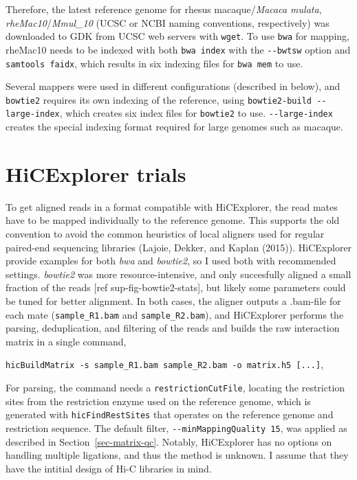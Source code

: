 \documentclass[
  11pt,
  a4paper,
]{scrbook}
\let\oldemph\emph
\renewcommand\emph[1]{\oldemph{\color{gray}#1}}
\begin{document}
Therefore, the latest reference genome for rhesus macaque/\emph{Macaca
mulata}, \emph{rheMac10}/\emph{Mmul\_10} (UCSC or NCBI naming
conventions, respectively) was downloaded to GDK from UCSC web servers
with \texttt{wget}. To use \texttt{bwa} for mapping, rheMac10 needs to
be indexed with both \texttt{bwa\ index} with the \texttt{-\/-bwtsw}
option and \texttt{samtools\ faidx}, which results in six indexing files
for \texttt{bwa\ mem} to use.

Several mappers were used in different configurations (described in
below), and \texttt{bowtie2} requires its own indexing of the reference,
using \texttt{bowtie2-build\ -\/-large-index}, which creates six index
files for \texttt{bowtie2} to use. \texttt{-\/-large-index} creates the
special indexing format required for large genomes such as macaque.

\section{HiCExplorer trials}\label{hicexplorer-trials}

To get aligned reads in a format compatible with HiCExplorer, the read
mates have to be mapped individually to the reference genome. This
supports the old convention to avoid the common heuristics of local
aligners used for regular paired-end sequencing libraries (Lajoie,
Dekker, and Kaplan (2015)). HiCExplorer provide examples for both
\emph{bwa} and \emph{bowtie2}, so I used both with recommended settings.
\emph{bowtie2} was more resource-intensive, and only succesfully aligned
a small fraction of the reads {[}ref sup-fig-bowtie2-stats{]}, but
likely some parameters could be tuned for better alignment. In both
cases, the aligner outputs a .bam-file for each mate
(\texttt{sample\_R1.bam} and \texttt{sample\_R2.bam}), and HiCExplorer
performs the parsing, deduplication, and filtering of the reads and
builds the raw interaction matrix in a single command,

\texttt{hicBuildMatrix\ -s\ sample\_R1.bam\ sample\_R2.bam\ -o\ matrix.h5\ {[}...{]}},

For parsing, the command needs a \texttt{restrictionCutFile}, locating
the restriction sites from the restriction enzyme used on the reference
genome, which is generated with \texttt{hicFindRestSites} that operates
on the reference genome and restriction sequence. The default filter,
\texttt{-\/-minMappingQuality\ 15}, was applied as described in
Section~\ref{sec-matrix-qc}. Notably, HiCExplorer has no options on
handling multiple ligations, and thus the method is unknown. I assume
that they have the intitial design of Hi-C libraries in mind.
\end{document}
